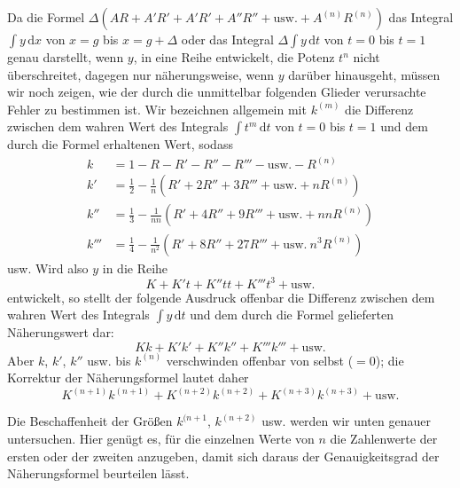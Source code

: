 
Da die Formel $\Delta(AR+\allowbreak A'R'+\allowbreak A'R'+\allowbreak A''R''+\allowbreak \text{usw.}+\allowbreak A^{(n)}R^{(n)})$ das Integral $\int y\,\mathrm{d}x$ von $x=g$ bis $x=g+\Delta$ oder das Integral $\Delta\int y\,\mathrm{d}t$ von $t=0$ bis $t=1$ genau darstellt, wenn $y$, in eine Reihe entwickelt, die Potenz $t^n$ nicht überschreitet, dagegen nur näherungsweise, wenn $y$ darüber hinausgeht, müssen wir noch zeigen, wie der durch die unmittelbar folgenden Glieder verursachte Fehler zu bestimmen ist. Wir bezeichnen allgemein mit $k^{(m)}$ die Differenz zwischen dem wahren Wert des Integrals $\int t^m\,\mathrm{d}t$ von $t=0$ bis $t=1$ und dem durch die Formel erhaltenen Wert, sodass
\[
\begin{aligned}
k&=1-R-R'-R''-R'''-\text{usw.}-R^{(n)}\\
k'&=\frac12-\frac1n(R'+2R''+3R'''+\text{usw.}+nR^{(n)})\\
k''&=\frac13-\frac1{nn}(R'+4R''+9R'''+\text{usw.}+nnR^{(n)})\\
k'''&=\frac14-\frac1{n^2}(R'+8R''+27R'''+\text{usw.}\ n^3R^{(n)})
\end{aligned}
\]
usw. Wird also $y$ in die Reihe
\[
K+K't+K''tt+K'''t^3+\text{usw.}
\]
entwickelt, so stellt der folgende Ausdruck offenbar die Differenz zwischen dem wahren Wert des Integrals $\int y\,\mathrm{d}t$ und dem durch die Formel gelieferten Näherungswert dar:
\[
Kk+K'k'+K''k''+K'''k'''+\text{usw.}
\]
Aber $k$, $k'$, $k''$ usw. bis $k^{(n)}$ verschwinden offenbar von selbst ($=0$); die Korrektur der Näherungsformel lautet daher
\[
K^{(n+1)}k^{(n+1)}+K^{(n+2)}k^{(n+2)}+K^{(n+3)}k^{(n+3)}+\text{usw.}
\]

Die Beschaffenheit der Größen $k^{(n+1}$, $k^{(n+2)}$ usw. werden wir unten genauer untersuchen. Hier genügt es, für die einzelnen Werte von $n$ die Zahlenwerte der ersten oder der zweiten anzugeben, damit sich daraus der Genauigkeitsgrad der Näherungsformel beurteilen lässt.

